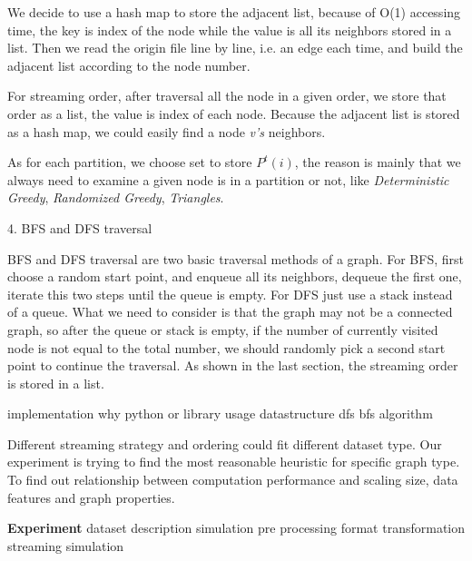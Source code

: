 \documentclass[12pt]{article}
\begin{document}
We decide to use a hash map to store the adjacent list, because of O(1) accessing time, the key is index of the node while the value is all its neighbors stored in a list. Then we read the origin file line by line, i.e. an edge each time, and build the adjacent list according to the node number.

For streaming order, after traversal all the node in a given order, we store that order as a list, the value is index of each node. Because the adjacent list is stored as a hash map, we could easily find a node \emph{v's} neighbors.

As for each partition, we choose set to store $P^{t}(i)$, the reason is mainly that we always need to examine a given node is in a partition or not, like \emph{Deterministic Greedy}, \emph{Randomized Greedy}, \emph{Triangles}.


4. BFS and DFS traversal

BFS and DFS traversal are two basic traversal methods of a graph. For BFS, first choose a random start point, and enqueue all its neighbors, dequeue the first one, iterate this two steps until the queue is empty. For DFS just use a stack instead of a queue. What we need to consider is that the graph may not be a connected graph, so after the queue or stack is empty, if the number of currently visited node is not equal to the total number, we should randomly pick a second start point to continue the traversal. As shown in the last section, the streaming order is stored in a list.


implementation
	why python or library usage
	datastructure
	dfs bfs algorithm



Different streaming strategy and ordering could fit different dataset type. Our experiment is trying to find the most reasonable heuristic for specific graph type. To find out relationship between computation performance and scaling size, data features and graph properties.

\textbf{Experiment}
dataset description
simulation
	pre processing
	format transformation
	streaming simulation
\end{document}
